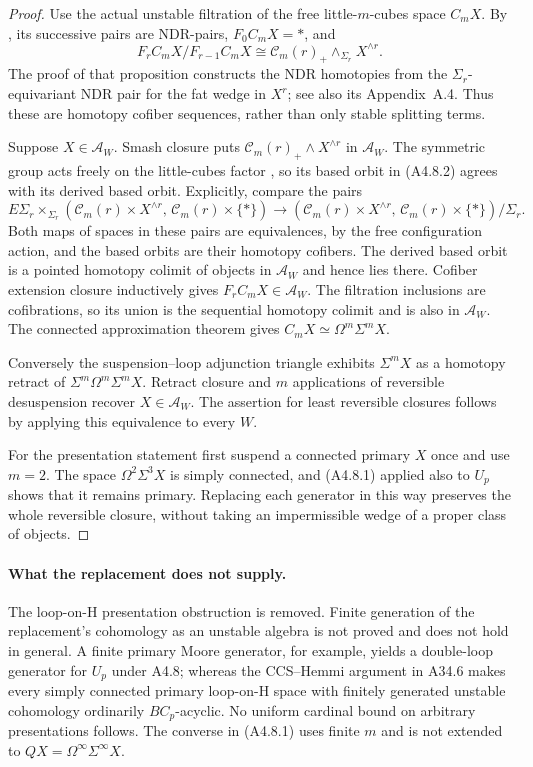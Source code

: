 \begin{proof}
Use the actual unstable filtration of the free little-$m$-cubes
space $C_mX$.  By \citet[Proposition~2.6(i)--(ii)]{A3May1972},
its successive pairs are NDR-pairs, $F_0C_mX=*$, and
\[
 F_rC_mX/F_{r-1}C_mX
       \cong \mathcal C_m(r)_+\wedge_{\Sigma_r}X^{\wedge r}.
 \tag{A4.8.2}
\]
The proof of that proposition constructs the NDR homotopies from
the $\Sigma_r$-equivariant NDR pair for the fat wedge in $X^r$;
see also its Appendix~A.4.  Thus these are homotopy cofiber
sequences, rather than only stable splitting terms.

Suppose $X\in\mathcal A_W$.  Smash closure puts
$\mathcal C_m(r)_+\wedge X^{\wedge r}$ in $\mathcal A_W$.
The symmetric group acts freely on the little-cubes factor
\citep[Corollary~4.6]{A3May1972}, so its based orbit in
\textup{(A4.8.2)} agrees with its derived based orbit.
Explicitly, compare the pairs
\[
 E\Sigma_r\times_{\Sigma_r}
       (\mathcal C_m(r)\times X^{\wedge r},\,
        \mathcal C_m(r)\times\{*\})
 \longrightarrow
 (\mathcal C_m(r)\times X^{\wedge r},\,
        \mathcal C_m(r)\times\{*\})/\Sigma_r.
\]
Both maps of spaces in these pairs are equivalences, by the free
configuration action, and the based orbits are their homotopy
cofibers.  The derived based orbit is a pointed homotopy colimit
of objects in $\mathcal A_W$ and hence lies there.  Cofiber
extension closure inductively gives $F_rC_mX\in\mathcal A_W$.
The filtration inclusions are cofibrations, so its union is the
sequential homotopy colimit and is also in $\mathcal A_W$.
The connected approximation theorem
\citep[Theorem~6.1]{A3May1972} gives
$C_mX\simeq\Omega^m\Sigma^mX$.

Conversely the suspension--loop adjunction triangle exhibits
$\Sigma^mX$ as a homotopy retract of
$\Sigma^m\Omega^m\Sigma^mX$.  Retract closure and $m$ applications
of reversible desuspension recover $X\in\mathcal A_W$.
The assertion for least reversible closures follows by applying
this equivalence to every $W$.

For the presentation statement first suspend a connected primary
$X$ once and use $m=2$.  The space $\Omega^2\Sigma^3X$ is simply
connected, and \textup{(A4.8.1)} applied also to $U_p$ shows that
it remains primary.  Replacing each generator in this way preserves
the whole reversible closure, without taking an impermissible wedge
of a proper class of objects.
\end{proof}

\paragraph{What the replacement does not supply.}
The loop-on-H presentation obstruction is removed.  Finite generation
of the replacement's cohomology as an unstable algebra is not proved
and does not hold in general.  A finite primary Moore generator, for
example, yields a double-loop generator for $U_p$ under A4.8;
whereas the CCS--Hemmi argument in A34.6 makes every simply connected
primary loop-on-H space with finitely generated unstable cohomology
ordinarily $BC_p$-acyclic.  No uniform cardinal bound on arbitrary
presentations follows.  The converse in \textup{(A4.8.1)} uses
finite $m$ and is not extended to $QX=\Omega^\infty\Sigma^\infty X$.

